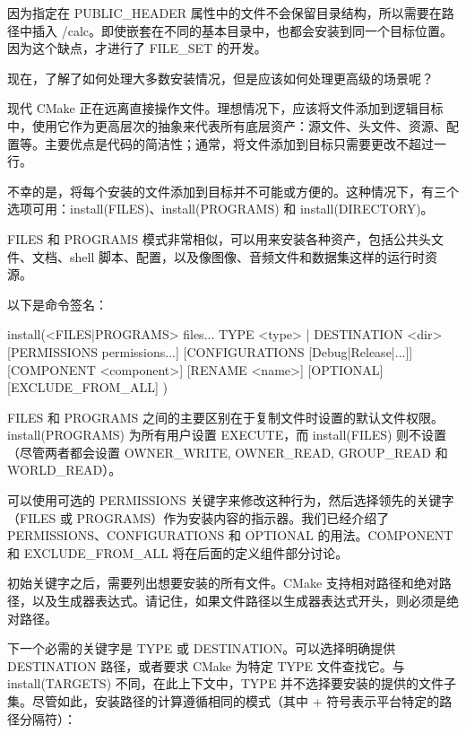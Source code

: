 
因为指定在 PUBLIC\_HEADER 属性中的文件不会保留目录结构，所以需要在路径中插入 /calc。即使嵌套在不同的基本目录中，也都会安装到同一个目标位置。因为这个缺点，才进行了 FILE\_SET 的开发。

现在，了解了如何处理大多数安装情况，但是应该如何处理更高级的场景呢？


现代 CMake 正在远离直接操作文件。理想情况下，应该将文件添加到逻辑目标中，使用它作为更高层次的抽象来代表所有底层资产：源文件、头文件、资源、配置等。主要优点是代码的简洁性；通常，将文件添加到目标只需要更改不超过一行。

不幸的是，将每个安装的文件添加到目标并不可能或方便的。这种情况下，有三个选项可用：install(FILES)、install(PROGRAMS) 和 install(DIRECTORY)。


FILES 和 PROGRAMS 模式非常相似，可以用来安装各种资产，包括公共头文件、文档、shell 脚本、配置，以及像图像、音频文件和数据集这样的运行时资源。

以下是命令签名：

\begin{shell}
install(<FILES|PROGRAMS> files...
        TYPE <type> | DESTINATION <dir>
        [PERMISSIONS permissions...]
        [CONFIGURATIONS [Debug|Release|...]]
        [COMPONENT <component>]
        [RENAME <name>] [OPTIONAL] [EXCLUDE_FROM_ALL]
)
\end{shell}

FILES 和 PROGRAMS 之间的主要区别在于复制文件时设置的默认文件权限。install(PROGRAMS) 为所有用户设置 EXECUTE，而 install(FILES) 则不设置（尽管两者都会设置 OWNER\_WRITE, OWNER\_READ, GROUP\_READ 和 WORLD\_READ）。

可以使用可选的 PERMISSIONS 关键字来修改这种行为，然后选择领先的关键字（FILES 或 PROGRAMS）作为安装内容的指示器。我们已经介绍了 PERMISSIONS、CONFIGURATIONS 和 OPTIONAL 的用法。COMPONENT 和 EXCLUDE\_FROM\_ALL 将在后面的定义组件部分讨论。

初始关键字之后，需要列出想要安装的所有文件。CMake 支持相对路径和绝对路径，以及生成器表达式。请记住，如果文件路径以生成器表达式开头，则必须是绝对路径。

下一个必需的关键字是 TYPE 或 DESTINATION。可以选择明确提供 DESTINATION 路径，或者要求 CMake 为特定 TYPE 文件查找它。与 install(TARGETS) 不同，在此上下文中，TYPE 并不选择要安装的提供的文件子集。尽管如此，安装路径的计算遵循相同的模式（其中 + 符号表示平台特定的路径分隔符）：

